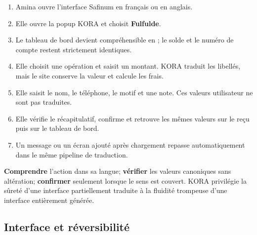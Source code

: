 \begin{enumerate}
  \item Amina ouvre l’interface Safinum en français ou en anglais.
  \item Elle ouvre la popup KORA et choisit \textbf{Fulfulde}.
  \item Le tableau de bord devient compréhensible en ; le solde et
        le numéro de compte restent strictement identiques.
  \item Elle choisit une opération et saisit un montant. KORA traduit les
        libellés, mais le site conserve la valeur et calcule les frais.
  \item Elle saisit le nom, le téléphone, le motif et une note. Ces valeurs
        utilisateur ne sont pas traduites.
  \item Elle vérifie le récapitulatif, confirme et retrouve les mêmes valeurs
        sur le reçu puis sur le tableau de bord.
  \item Un message ou un écran ajouté après chargement repasse
        automatiquement dans le même pipeline de traduction.
\end{enumerate}

\begin{keybox}
\textbf{Comprendre} l’action dans sa langue; \textbf{vérifier} les valeurs
canoniques sans altération; \textbf{confirmer} seulement lorsque le sens est
couvert. KORA privilégie la sûreté d’une interface partiellement traduite à la
fluidité trompeuse d’une interface entièrement générée.
\end{keybox}

\subsection{Interface et réversibilité}

